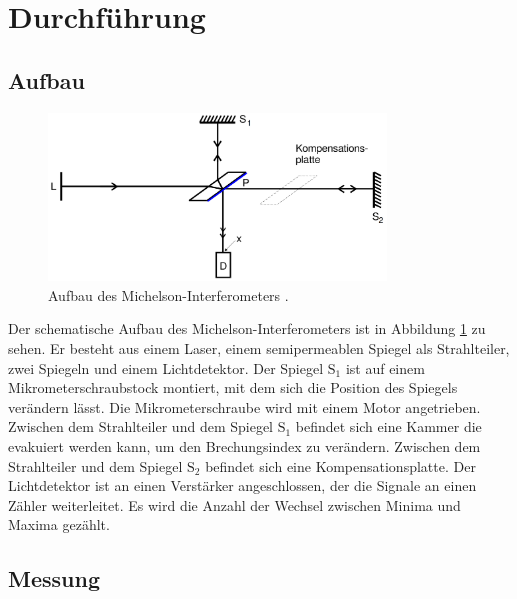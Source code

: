 \section{Durchführung}
\label{sec:Durchführung}

\subsection{Aufbau}

\begin{figure}[h!]
    \centering
    \includegraphics[width=0.8\textwidth]{img/aufbau.png}
    \caption{Aufbau des Michelson-Interferometers \cite{V401}.}
    \label{fig:Aufbau}
\end{figure}

Der schematische Aufbau des Michelson-Interferometers ist in Abbildung \ref{fig:Aufbau} zu sehen.
Er besteht aus einem Laser, einem semipermeablen Spiegel als Strahlteiler, zwei Spiegeln und einem Lichtdetektor.
Der Spiegel $\text{S}_1$ ist auf einem Mikrometerschraubstock montiert, mit dem sich die Position des Spiegels verändern lässt.
Die Mikrometerschraube wird mit einem Motor angetrieben. Zwischen dem Strahlteiler und dem Spiegel $\text{S}_1$ befindet sich
eine Kammer die evakuiert werden kann, um den Brechungsindex zu verändern. 
Zwischen dem Strahlteiler und dem Spiegel $\text{S}_2$ befindet sich eine Kompensationsplatte.
Der Lichtdetektor ist an einen Verstärker angeschlossen, der die Signale an einen Zähler weiterleitet.
Es wird die Anzahl der Wechsel zwischen Minima und Maxima gezählt.

\subsection{Messung}


